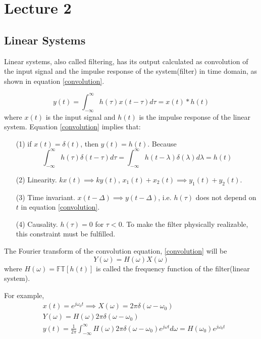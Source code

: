 \chapter*{Lecture 2}


\section*{Linear Systems}

Linear systems, also called filtering, has its output calculated as convolution of the input signal and 
the impulse response of the system(filter) in time domain, as shown in equation \ref{convolution}.

\begin{equation}
y(t) = \int_{-\infty}^{\infty}h(\tau)x(t-\tau)d\tau = x(t) \ast h(t)
\label{convolution}
\end{equation}
where $x(t)$ is the input signal and $h(t)$ is the impulse response of the linear system. 
Equation \ref{convolution} implies that:

\begin{itemize}
\item[(1)] if $x(t) = \delta(t)$, then $y(t) = h(t)$. Because
\begin{equation}
\int_{-\infty}^{\infty}h(\tau)\delta (t-\tau) d\tau = \int_{-\infty}^{\infty}h(t-\lambda)\delta (\lambda) d\lambda = h(t)
\end{equation}
\item[(2)] Linearity. $k x(t) \implies k y(t)$, $x_1(t) + x_2(t) \implies y_1(t) + y_2(t)$.
\item[(3)] Time invariant. $x(t-\Delta) \implies y(t-\Delta)$, i.e. $h(\tau)$ does not depend on $t$ in equation \ref{convolution}.
\item[(4)] Causality. $h(\tau) = 0$ for $\tau < 0$. To make the filter physically realizable, this constraint must be fulfilled. 
\end{itemize}

The Fourier transform of the convolution equation, \ref{convolution} will be 
\begin{equation}
Y(\omega) = H(\omega)X(\omega)
\end{equation}
where $H(\omega) = \mathbb{FT}[h(t)]$ is called the frequency function of the filter(linear system). 

For example, 
\begin{equation}
\begin{aligned}
& x(t)=e^{j\omega_0t}   \implies {X}(\omega) = 2\pi\delta(\omega-\omega_0) \\
& {Y}(\omega) = {H}(\omega) 2 \pi \delta (\omega - \omega_0)  \\
&  y(t) = \frac{1}{2\pi} \int_{-\infty}^{\infty} {H}(\omega)2\pi\delta(\omega - \omega_0) e^{j\omega t} d\omega 
= {H}(\omega_0)e^{j\omega_0 t}
\end{aligned}
\end{equation}

